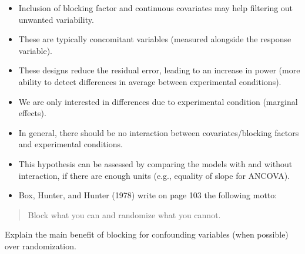 \documentclass[
  11pt,
  letterpaper,
]{scrbook}
\providecommand{\tightlist}{%
  \setlength{\itemsep}{0pt}\setlength{\parskip}{0pt}}\usepackage{longtable,booktabs,array}
\theoremstyle{definition}
\theoremstyle{remark}
\begin{document}
\begin{tcolorbox}[enhanced jigsaw, title=\textcolor{quarto-callout-important-color}{\faExclamation}\hspace{0.5em}{\textbf{Summary}}, bottomtitle=1mm, opacitybacktitle=0.6, colframe=quarto-callout-important-color-frame, leftrule=.75mm, coltitle=black, colbacktitle=quarto-callout-important-color!10!white, colback=white, toprule=.15mm, rightrule=.15mm, breakable, bottomrule=.15mm, opacityback=0, toptitle=1mm, titlerule=0mm, arc=.35mm, left=2mm]

\begin{itemize}
\tightlist
\item
  Inclusion of blocking factor and continuous covariates may help
  filtering out unwanted variability.
\item
  These are typically concomitant variables (measured alongside the
  response variable).
\item
  These designs reduce the residual error, leading to an increase in
  power (more ability to detect differences in average between
  experimental conditions).
\item
  We are only interested in differences due to experimental condition
  (marginal effects).
\item
  In general, there should be no interaction between covariates/blocking
  factors and experimental conditions.
\item
  This hypothesis can be assessed by comparing the models with and
  without interaction, if there are enough units (e.g., equality of
  slope for ANCOVA).
\end{itemize}

\end{tcolorbox}

\begin{tcolorbox}[enhanced jigsaw, title=\textcolor{quarto-callout-tip-color}{\faLightbulb}\hspace{0.5em}{Your turn}, bottomtitle=1mm, opacitybacktitle=0.6, colframe=quarto-callout-tip-color-frame, leftrule=.75mm, coltitle=black, colbacktitle=quarto-callout-tip-color!10!white, colback=white, toprule=.15mm, rightrule=.15mm, breakable, bottomrule=.15mm, opacityback=0, toptitle=1mm, titlerule=0mm, arc=.35mm, left=2mm]

\begin{itemize}
\tightlist
\item
  Box, Hunter, and Hunter (1978) write on page 103 the following motto:
\end{itemize}

\begin{quote}
Block what you can and randomize what you cannot.
\end{quote}

Explain the main benefit of blocking for confounding variables (when
possible) over randomization.

\end{tcolorbox}
\end{document}
